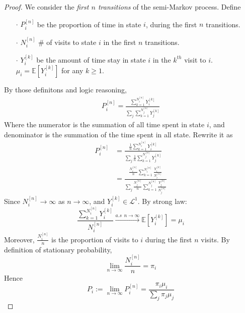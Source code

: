 \documentclass[a4paper, 10pt]{article}
\theoremstyle{definition}
\theoremstyle{hSol}
\begin{document}
\begin{proof} We consider the \emph{first $n$ transitions} of the semi-Markov process. Define
\begin{itemize}
  \item[$\cdot$] $P_i^{[n]}$ be the proportion of time in state $i$, during the first $n$ transitions.
  \item[$\cdot$] $N_i^{[n]}$ \# of visits to state $i$ in the first $n$ transitions.
  \item[$\cdot$] $Y_i^{[k]}$ be the amount of time stay in state $i$ in the $k^{th}$ visit to $i$. $\mu_i = \mathbb{E}\left[Y_i^{[k]}\right]$ for any $k\geq 1$.
\end{itemize}
By those definitons and logic reasoning,
\begin{equation}
  \begin{split}
    P_i^{[n]} = \frac{\sum_{k=1}^{N_i^{[n]}}Y_i^{[k]}}{\sum_{j}\sum_{k=1}^{N_j^{[n]}}Y_j^{[k]}}
  \end{split}
\end{equation}
Where the numerator is the summation of all time spent in state $i$, and denominator is the summation of the time spent in all state. Rewrite it as
\begin{equation}
  \begin{split}
    P_i^{[n]} 
    &= \frac{\frac{1}{n}\sum_{k=1}^{N_i^{[n]}}Y_i^{[k]}}{\sum_{j}\frac{1}{n}\sum_{k=1}^{N_j^{[n]}}Y_j^{[k]}} \\
    &= \frac{\frac{N_i^{[n]}}{n}\sum_{k=1}^{N_i^{[n]}}\frac{Y_i^{[k]}}{N_i^{[n]}}}{\sum_{j}\frac{N_j^{[n]}}{n}\sum_{k=1}^{N_j^{[n]}}\frac{Y_j^{[k]}}{N_j^{[n]}}}
  \end{split}
\end{equation}
Since $N_i^{[n]} \to \infty$ as $n\to \infty$, and $Y_i^{[k]}\in \mathcal{L}^1$. By strong law:
\begin{equation}
  \frac{\sum_{k=1}^{N_i^{[n]}}Y_i^{[k]}}{N_i^{[n]}} \xrightarrow{a.s~~n\to \infty} \mathbb{E}\left[Y_i^{[k]}\right] = \mu_i
\end{equation}
Moreover, $\frac{N_i^{[n]}}{n}$ is the proportion of visits to $i$ during the first $n$ visits. By definition of stationary probability,
\begin{equation}
  \lim\limits_{n\rightarrow\infty}\frac{N_i^{[n]}}{n} = \pi_i
\end{equation}
Hence
\begin{equation}
  P_i:=\lim\limits_{n\rightarrow\infty}P_i^{[n]}=\frac{\pi_i \mu_i}{\sum_j \pi_j \mu_j}
\end{equation}
\end{proof}
\end{document}
